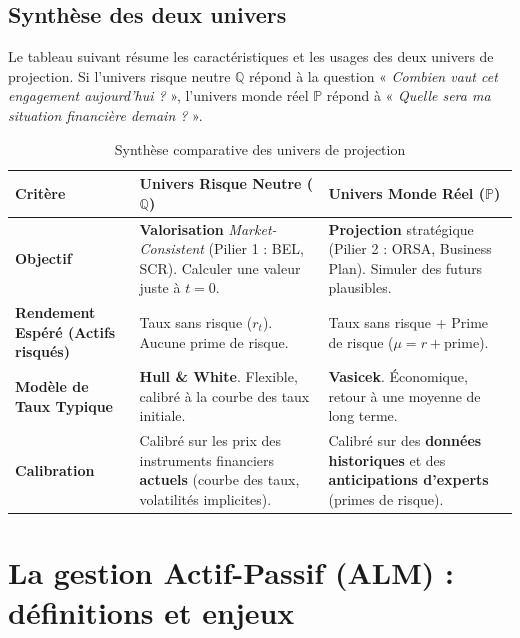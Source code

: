 \subsection{Synthèse des deux univers}

Le tableau suivant résume les caractéristiques et les usages des deux univers de projection. Si l'univers risque neutre $\mathbb{Q}$ répond à la question « \textit{Combien vaut cet engagement aujourd'hui ?} », l'univers monde réel $\mathbb{P}$ répond à « \textit{Quelle sera ma situation financière demain ?} ».

\begin{table}[H]
    \centering
    \caption{Synthèse comparative des univers de projection}
    \label{tab:univers_s2_comp}
    \begin{tabularx}{\textwidth}{l >{\raggedright\arraybackslash}X >{\raggedright\arraybackslash}X}
        \toprule
        \textbf{Critère} & \textbf{\texorpdfstring{Univers Risque Neutre ($\mathbb{Q}$)}{Univers Risque Neutre (Q)}} & \textbf{\texorpdfstring{Univers Monde Réel ($\mathbb{P}$)}{Univers Monde Réel (P)}} \\
        \midrule
        \textbf{Objectif}
        &
        \textbf{Valorisation} \textit{Market-Consistent} (Pilier 1 : BEL, SCR). Calculer une valeur juste à $t=0$.
        &
        \textbf{Projection} stratégique (Pilier 2 : ORSA, Business Plan). Simuler des futurs plausibles. \\
        \addlinespace
        \textbf{Rendement Espéré (Actifs risqués)}
        &
        Taux sans risque ($r_t$). Aucune prime de risque.
        &
        Taux sans risque + Prime de risque ($\mu = r + \text{prime}$). \\
        \addlinespace
        \textbf{Modèle de Taux Typique}
        &
        \textbf{Hull \& White}. Flexible, calibré à la courbe des taux initiale.
        &
        \textbf{Vasicek}. Économique, retour à une moyenne de long terme. \\
        \addlinespace
        \textbf{Calibration}
        &
        Calibré sur les prix des instruments financiers \textbf{actuels} (courbe des taux, volatilités implicites).
        &
        Calibré sur des \textbf{données historiques} et des \textbf{anticipations d'experts} (primes de risque). \\
        \bottomrule
    \end{tabularx}
\end{table}

\section{La gestion Actif-Passif (ALM) : définitions et enjeux}
\label{sec:alm}

